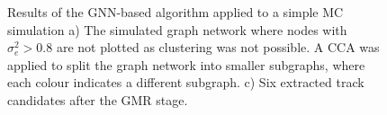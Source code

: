 \begin{figure}[htbp]%
    \centering
    \hfill
    \caption{Results of the GNN-based algorithm applied to a simple MC simulation a) The simulated graph network where nodes with $\sigma_e^2 > 0.8$ are not plotted as clustering was not possible. A CCA was applied to split the graph network into smaller subgraphs, where each colour indicates a different subgraph. c) Six extracted track candidates after the GMR stage.}%
    \label{fig:example-application-2}%
\end{figure}



